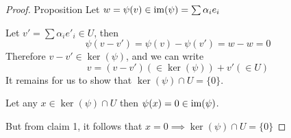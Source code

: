 \begin{proof} {Proposition}
    Let \(w = \psi(v) \in \mathrm{im}(\psi) = \sum \alpha_i e_i\)

    Let \(v' = \sum \alpha_i e'_i \in U\), then \[
    \psi(v - v') = \psi(v) - \psi(v') = w - w = 0
    \]
    Therefore \(v - v' \in \ker(\psi)\), and we can write \[
    v = (v- v') (\in \ker(\psi)) + v' (\in U)
    \]
    It remains for us to show that \(\ker(\psi) \cap U = \{0\}\).

    Let any \(x \in \ker(\psi) \cap U\) then \(\psi(x) = 0 \in \mathrm{im}(\psi)\).
    
    But from claim 1, it follows that \(x = 0 \implies \ker(\psi) \cap U = \{0\}\)
\end{proof}